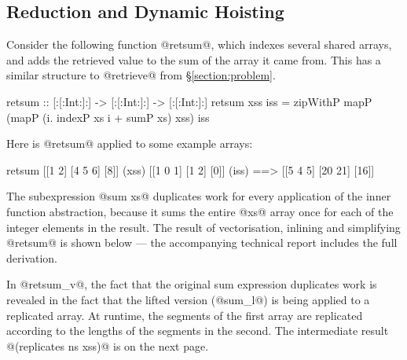 \subsection{Reduction and Dynamic Hoisting}
\label{section:Reduction}
Consider the following function @retsum@, which indexes several shared arrays, and adds the retrieved value to the sum of the array it came from. This has a similar structure to @retrieve@ from \S\ref{section:problem}.
\par
\begin{small}
\begin{code}
retsum :: [:[:Int:]:] -> [:[:Int:]:] -> [:[:Int:]:]
retsum xss iss
 = zipWithP mapP 
           (mapP (\xs i. indexP xs i + sumP xs) xss) iss
\end{code}
\end{small}
%
Here is @retsum@ applied to some example arrays:

\begin{small}
\begin{code}
 retsum  [[1 2]   [4 5 6] [8]]       (xss)
         [[1 0 1] [1 2]   [0]]       (iss)
    ==>  [[5 4 5] [20 21] [16]]
\end{code}
\end{small}
%
The subexpression @sum xs@ duplicates work for every application of the inner function abstraction, because it sums the entire @xs@ array once for each of the integer elements in the result. The result of vectorisation, inlining and simplifying @retsum@ is shown below --- the accompanying technical report \cite{lippmeier-etal:replicate-tr} includes the full derivation.
\par
\begin{small}
\end{small}
\par
In @retsum_v@, the fact that the original sum expression duplicates work is revealed in the fact that the lifted version (@sum_l@) is being applied to a replicated array. At runtime, the segments of the first array are replicated according to the lengths of the segments in the second. The intermediate result @(replicates ns xss)@ is on the next page.


